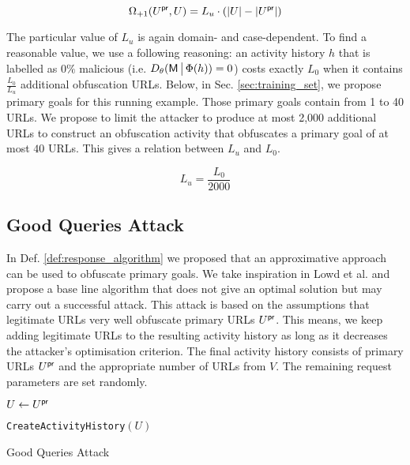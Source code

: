 \begin{equation}
    \Omega_{{\text{+}1}}(U^{\mathsf{pr}}, U) = L_u \cdot (|U| - |U^{\mathsf{pr}}|)
\end{equation}

The particular value of $L_u$ is again domain- and case-dependent. To find a reasonable value, we use a following reasoning: an activity history $h$ that is labelled as $0\%$ malicious (i.e. $D_\theta(\mathsf{M} \,\big|\, \Phi(h)) = 0$) costs exactly $L_0$ when it contains $\frac{L_0}{L_u}$ additional obfuscation URLs. Below, in Sec. \ref{sec:training_set}, we propose primary goals for this running example. Those primary goals contain from 1 to 40 URLs. We propose to limit the attacker to produce at most 2,000 additional URLs to construct an obfuscation activity that obfuscates a primary goal of at most $40$ URLs. This gives a relation between $L_u$ and $L_0$.

\begin{equation}
    L_u = \frac{L_0}{2000}
\end{equation}

\subsection{Good Queries Attack}\label{sec:good_queries_attack}
In Def. \ref{def:response_algorithm} we proposed that an approximative approach can be used to obfuscate primary goals. We take inspiration in Lowd et al. \cite{good_word_attacks} and propose a base line algorithm that does not give an optimal solution but may carry out a successful attack. This attack is based on the assumptions that legitimate URLs very well obfuscate primary URLs $U^{\mathsf{pr}}$. This means, we keep adding legitimate URLs to the resulting activity history as long as it decreases the attacker's optimisation criterion. The final activity history consists of primary URLs $U^{\mathsf{pr}}$ and the appropriate number of URLs from $V$. The remaining request parameters are set randomly.

\begin{algorithm}[H]
    \SetAlgoLined
    $U \gets U^{\mathsf{pr}}$\;


    \Return \texttt{CreateActivityHistory}$(U)$

    \caption{Good Queries Attack}
\end{algorithm}

